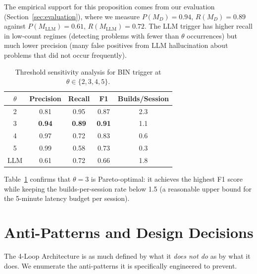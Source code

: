 \documentclass[11pt]{article}
\begin{document}
The empirical support for this proposition comes from our evaluation
(Section~\ref{sec:evaluation}), where we measure $P(M_D) = 0.94$, $R(M_D) = 0.89$
against $P(M_{\text{LLM}}) = 0.61$, $R(M_{\text{LLM}}) = 0.72$. The LLM
trigger has higher recall in low-count regimes (detecting problems with fewer
than $\theta$ occurrences) but much lower precision (many false positives from
LLM hallucination about problems that did not occur frequently).

\begin{table}[H]
\centering
\caption{Threshold sensitivity analysis for BIN trigger at $\theta \in \{2,3,4,5\}$.}
\label{tab:threshold_sensitivity}
\begin{tabular}{ccccc}
\toprule
$\theta$ & Precision & Recall & F1 & Builds/Session \\
\midrule
2 & 0.81 & 0.95 & 0.87 & 2.3 \\
3 & \textbf{0.94} & \textbf{0.89} & \textbf{0.91} & 1.1 \\
4 & 0.97 & 0.72 & 0.83 & 0.6 \\
5 & 0.99 & 0.58 & 0.73 & 0.3 \\
\midrule
LLM & 0.61 & 0.72 & 0.66 & 1.8 \\
\bottomrule
\end{tabular}
\end{table}

Table~\ref{tab:threshold_sensitivity} confirms that $\theta = 3$ is Pareto-optimal:
it achieves the highest F1 score while keeping the builds-per-session rate
below 1.5 (a reasonable upper bound for the 5-minute latency budget per session).

\section{Anti-Patterns and Design Decisions}
\label{sec:antipatterns}

The 4-Loop Architecture is as much defined by what it \emph{does not do} as
by what it does. We enumerate the anti-patterns it is specifically engineered
to prevent.
\end{document}
